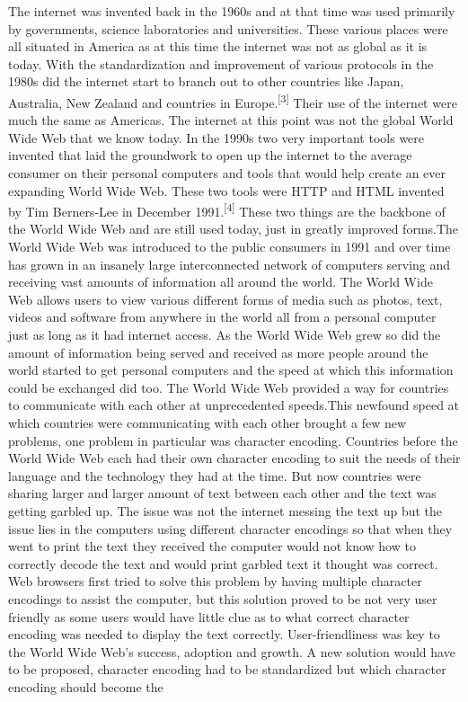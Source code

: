 \documentclass{article}
\begin{document}
\begin{multicols*}{2}
\break
{}\begin{flushleft}
The internet was invented back in the 1960s and at that time was used primarily by governments, science laboratories and universities. These various places were all situated in America as at this time the internet was not as global as it is today. With the standardization and improvement of various protocols in the 1980s did the internet start to branch out to other countries like Japan, Australia, New Zealand and countries in Europe.\textsuperscript{[3]} Their use of the internet were much the same as Americas. The internet at this point was not the global World Wide Web that we know today. In the 1990s two very important tools were invented that laid the groundwork to open up the internet to the average consumer on their personal computers and tools that would help create an ever expanding World Wide Web. These two tools were HTTP and HTML invented by Tim Berners-Lee in December 1991.\textsuperscript{[4]} These two things are the backbone of the World Wide Web and are still used today, just in greatly improved forms.\linebreak\linebreak The World Wide Web was introduced to the public consumers in 1991 and over time has grown in an insanely large interconnected network of computers serving and receiving vast amounts of information all around the world. The World Wide Web allows users to view various different forms of media such as photos, text, videos and software from anywhere in the world all from a personal computer just as long as it had internet access. As the World Wide Web grew so did the amount of information being served and received as more people around the world started to get personal computers and the speed at which this information could be exchanged did too. The World Wide Web provided a way for countries to communicate with each other at unprecedented speeds.\linebreak\linebreak This newfound speed at which countries were communicating with each other brought a few new problems, one problem in particular was character encoding. Countries before the World Wide Web each had their own character encoding to suit the needs of their language and the technology they had at the time. But now countries were sharing larger and larger amount of text between each other and the text was getting garbled up. The issue was not the internet messing the text up but the issue lies in the computers using different character encodings so that when they went to print the text they received the computer would not know how to correctly decode the text and would print garbled text it thought was correct. Web browsers first tried to solve this problem by having multiple character encodings to assist the computer, but this solution proved to be not very user friendly as some users would have little clue as to what correct character encoding was needed to display the text correctly. User-friendliness was key to the World Wide Web's success, adoption and growth. A new solution would have to be proposed, character encoding had to be standardized but which character encoding should become the 
\end{flushleft}
\end{multicols*}
\end{document}
